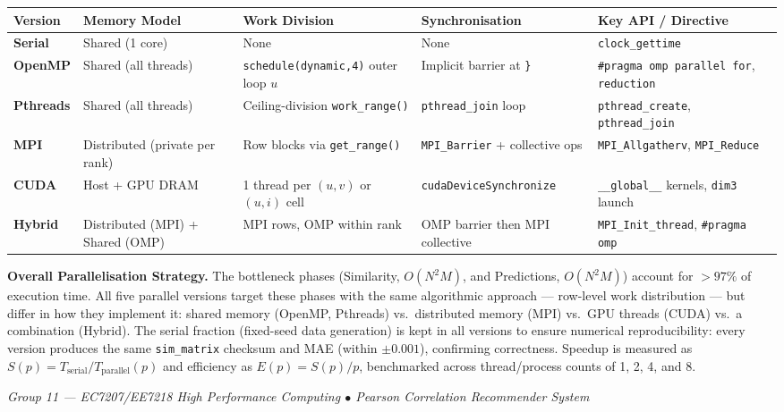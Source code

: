 \documentclass[12pt,a4paper]{article}
\begin{document}
\begin{center}
\renewcommand{\arraystretch}{1.4}
\begin{tabular}{>{\bfseries}p{2.3cm} p{2.5cm} p{2.8cm} p{3.5cm} p{2.8cm}}
\toprule
Version & Memory Model & Work Division & Synchronisation & Key API / Directive \\
\midrule
Serial &
  Shared (1 core) &
  None &
  None &
  \texttt{clock\_gettime} \\

\rowcolor{ompcol!10}
OpenMP &
  Shared (all threads) &
  \texttt{schedule(dynamic,4)} outer loop $u$ &
  Implicit barrier at \texttt{\}} &
  \texttt{\#pragma omp parallel for}, \texttt{reduction} \\

Pthreads &
  Shared (all threads) &
  Ceiling-division \texttt{work\_range()} &
  \texttt{pthread\_join} loop &
  \texttt{pthread\_create}, \texttt{pthread\_join} \\

\rowcolor{mpicol!8}
MPI &
  Distributed (private per rank) &
  Row blocks via \texttt{get\_range()} &
  \texttt{MPI\_Barrier} + collective ops &
  \texttt{MPI\_Allgatherv}, \texttt{MPI\_Reduce} \\

CUDA &
  Host + GPU DRAM &
  1 thread per $(u,v)$ or $(u,i)$ cell &
  \texttt{cudaDeviceSynchronize} &
  \texttt{\_\_global\_\_} kernels, \texttt{dim3} launch \\

\rowcolor{hybcol!8}
Hybrid &
  Distributed (MPI) + Shared (OMP) &
  MPI rows, OMP within rank &
  OMP barrier then MPI collective &
  \texttt{MPI\_Init\_thread}, \texttt{\#pragma omp} \\
\bottomrule
\end{tabular}
\end{center}

\vspace{1em}

\begin{mdframed}[style=descbox]
\textbf{Overall Parallelisation Strategy.}  The bottleneck phases (Similarity,
$O(N^2 M)$, and Predictions, $O(N^2 M)$) account for $>97\%$ of execution time.
All five parallel versions target these phases with the same algorithmic
approach — row-level work distribution — but differ in how they implement it:
shared memory (OpenMP, Pthreads) vs.\ distributed memory (MPI) vs.\ GPU
threads (CUDA) vs.\ a combination (Hybrid).  The serial fraction (fixed-seed
data generation) is kept in all versions to ensure numerical reproducibility:
every version produces the same \texttt{sim\_matrix} checksum and MAE
(within $\pm 0.001$), confirming correctness.  Speedup is measured as
$S(p) = T_{\text{serial}} / T_{\text{parallel}}(p)$ and efficiency as
$E(p) = S(p)/p$, benchmarked across thread/process counts of 1, 2, 4, and 8.
\end{mdframed}

\vfill
\begin{center}
\small\textit{Group 11 — EC7207/EE7218 High Performance Computing
  $\bullet$ Pearson Correlation Recommender System}
\end{center}
\end{document}
